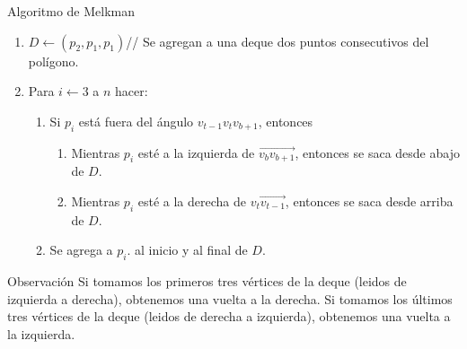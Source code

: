 \documentclass[aspectratio=169,xcolor=dvipsnames, t]{beamer}
\begin{document}
\begin{frame}{Algoritmo de Melkman}
  \begin{enumerate}
  \item $D\gets (p_{2},p_{1},p_{1}) $// Se agregan a una deque dos puntos consecutivos del polígono.
  \item Para $i\gets 3$ a $n$ hacer:
    \begin{enumerate}
    \item Si $p_{i}$ está fuera del ángulo $v_{t-1}v_tv_{b+1}$, entonces
      \begin{enumerate}
      \item Mientras $p_{i}$ esté a la izquierda de $\overrightarrow{v_{b}v_{b+1}}$, entonces se saca desde abajo de $D$.
      \item Mientras $p_{i}$ esté a la derecha de $\overrightarrow{v_{t}v_{t-1}}$, entonces se saca desde arriba de $D$.
      \end{enumerate}
    \item Se agrega a $p_{i}$. al inicio y al final de $D$.
    \end{enumerate}
  \end{enumerate}
  \begin{block}{Observación}
    \small
    Si tomamos los primeros tres vértices de la deque (leidos de izquierda a derecha), obtenemos una vuelta a la derecha. Si tomamos los últimos tres vértices de la deque (leidos de derecha a izquierda), obtenemos una vuelta a la izquierda.
  \end{block}
\end{frame}
\end{document}
